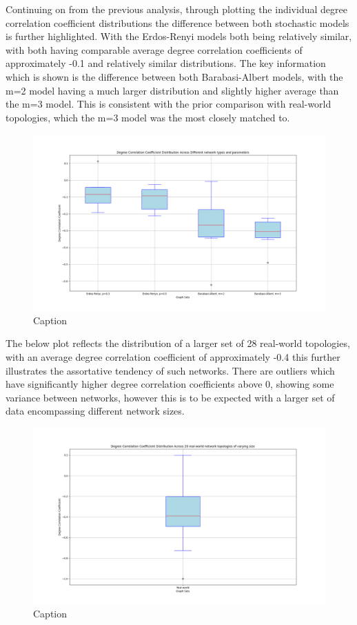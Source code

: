 Continuing on from the previous analysis, through plotting the individual degree correlation coefficient distributions the difference between both stochastic models is further highlighted. With the Erdos-Renyi models both being relatively similar, with both having comparable average degree correlation coefficients of approximately -0.1 and relatively similar distributions. The key information which is shown is the difference between both Barabasi-Albert models, with the m=2 model having a much larger distribution and slightly higher average than the m=3 model. This is consistent with the prior comparison with real-world topologies, which the m=3 model was the most closely matched to. 
\begin{figure}
    \centering
    \includegraphics[width=0.9\linewidth]{images/FINAL-TOPO-COMP/Degree-coeff-distrib/Distrib-by-param.png}
    \caption{Caption}
    \label{fig:enter-label}
\end{figure}

The below plot reflects the distribution of a larger set of 28 real-world topologies, with an average degree correlation coefficient of approximately -0.4 this further illustrates the assortative tendency of such networks. There are outliers which have significantly higher degree correlation coefficients above 0, showing some variance between networks, however this is to be expected with a larger set of data encompassing different network sizes. 

\begin{figure}
    \centering
    \includegraphics[width=0.9\linewidth]{images/FINAL-TOPO-COMP/Degree-coeff-distrib/Distrib-28-real-world.png}
    \caption{Caption}
    \label{fig:enter-label}
\end{figure}